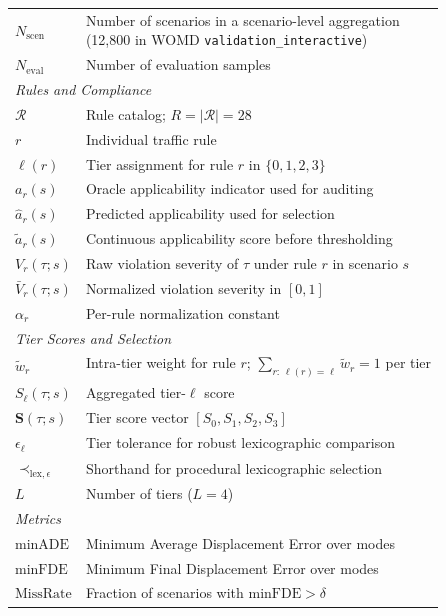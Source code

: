\begin{table}
\begin{tabular}{ll}
$N_{\text{scen}}$ & \shortstack{Number of scenarios in a scenario-level aggregation \\ (12{,}800 in WOMD \texttt{validation\_interactive})} \\
$N_{\text{eval}}$ & Number of evaluation samples \\
\midrule
\multicolumn{2}{l}{\textit{Rules and Compliance}} \\
$\mathcal{R}$ & Rule catalog; $R = |\mathcal{R}| = 28$ \\
$r$ & Individual traffic rule \\
$\ell(r)$ & Tier assignment for rule $r$ in $\{0,1,2,3\}$ \\
$a_r(s)$ & Oracle applicability indicator used for auditing \\
$\hat{a}_r(s)$ & Predicted applicability used for selection \\
$\tilde{a}_r(s)$ & Continuous applicability score before thresholding \\
$V_r(\tau; s)$ & Raw violation severity of $\tau$ under rule $r$ in scenario $s$ \\
$\bar{V}_r(\tau; s)$ & Normalized violation severity in $[0,1]$ \\
$\alpha_r$ & Per-rule normalization constant \\
\midrule
\multicolumn{2}{l}{\textit{Tier Scores and Selection}} \\
$\tilde{w}_r$ & Intra-tier weight for rule $r$; $\sum_{r:\,\ell(r)=\ell}\tilde{w}_r=1$ per tier \\
$S_\ell(\tau; s)$ & Aggregated tier-$\ell$ score \\
$\mathbf{S}(\tau; s)$ & Tier score vector $[S_0,S_1,S_2,S_3]$ \\
$\epsilon_\ell$ & Tier tolerance for robust lexicographic comparison \\
$\prec_{\text{lex},\epsilon}$ & Shorthand for procedural lexicographic selection \\
$L$ & Number of tiers ($L=4$) \\
\midrule
\multicolumn{2}{l}{\textit{Metrics}} \\
$\text{minADE}$ & Minimum Average Displacement Error over modes \\
$\text{minFDE}$ & Minimum Final Displacement Error over modes \\
$\text{MissRate}$ & Fraction of scenarios with $\text{minFDE} > \delta$ \\
\bottomrule
\end{tabular}
\end{table}

